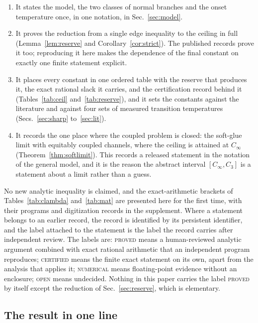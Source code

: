 \documentclass[aps,10pt,superscriptaddress,floatfix,amsmath,amssymb,nofootinbib]{revtex4-2}
\newcommand{\Cinf}{C_\infty}
\newcommand{\Cthree}{C_{3}}
\newcommand{\PROVED}{\textsc{proved}}
\newcommand{\CERT}{\textsc{certified}}
\newcommand{\NUM}{\textsc{numerical}}
\newcommand{\OPEN}{\textsc{open}}
\begin{document}
\begin{enumerate}
\item[\rm(i)] It states the model, the two classes of normal branches and the onset
temperature once, in one notation, in Sec.~\ref{sec:model}.
\item[\rm(ii)] It proves the reduction from a single edge inequality to the ceiling in full
(Lemma~\ref{lem:reserve} and Corollary~\ref{cor:strict}). The published records prove it
too; reproducing it here makes the dependence of the final constant on exactly one
finite statement explicit.
\item[\rm(iii)] It places every constant in one ordered table with the reserve that
produces it, the exact rational slack it carries, and the certification record behind it
(Tables~\ref{tab:ceil} and~\ref{tab:reserve}), and it sets the constants against the
literature and against four sets of measured transition temperatures
(Secs.~\ref{sec:sharp} to~\ref{sec:lit}).
\item[\rm(iv)] It records the one place where the coupled problem is closed: the soft-glue
limit with equitably coupled channels, where the ceiling is attained at $\Cinf$
(Theorem~\ref{thm:softlimit}). This records a released statement in the notation of the
general model, and it is the reason the abstract interval $[\Cinf,\Cthree]$ is a statement
about a limit rather than a guess.
\end{enumerate}

No new analytic inequality is claimed, and the exact-arithmetic brackets of
Tables~\ref{tab:clambda} and~\ref{tab:mat} are presented here for the first time, with their
programs and digitization records in the supplement. Where a statement belongs to an
earlier record, the record
is identified by its persistent identifier, and the label attached to the statement is the
label the record carries after independent review. The labels are: \PROVED{} means a
human-reviewed analytic argument combined with exact rational arithmetic that an
independent program reproduces; \CERT{} means the finite exact statement on its own, apart
from the analysis that applies it; \NUM{} means floating-point evidence without an
enclosure; \OPEN{} means undecided. Nothing in this paper carries the label \PROVED{} by
itself except the reduction of Sec.~\ref{sec:reserve}, which is elementary.

\subsection{The result in one line}
\end{document}
